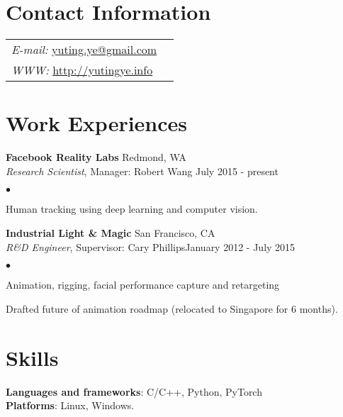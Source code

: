 \documentclass[margin,line]{res}
\newenvironment{list2}{
  \begin{list}{$\bullet$}{%
      \setlength{\itemsep}{0in}
      \setlength{\parsep}{0in} \setlength{\parskip}{0in}
      \setlength{\topsep}{0in} \setlength{\partopsep}{0in} 
      \setlength{\leftmargin}{0.2in}}}{\end{list}}
\begin{document}

\begin{resume}
\section{\sc Contact Information}
\vspace{.05in}
\begin{tabular}{@{}p{3in}p{3in}}
{\it E-mail:}    \href{mailto:yuting.ye@gmail.com}{yuting.ye@gmail.com} \\
{\it WWW:}  \href{http://yutingye.info}{http://yutingye.info} \\ 
\end{tabular}

\section{\sc Work Experiences}
{\bf Facebook Reality Labs} \hfill Redmond, WA \\
{\em Research Scientist}, Manager: Robert Wang \hfill July 2015 - present \\
\begin{list2}
\vspace*{-.15in}
\item Human tracking using deep learning and computer vision.
\end{list2}

{\bf Industrial Light \& Magic} \hfill San Francisco, CA  \\
{\em R\&D Engineer}, Supervisor: Cary Phillips\hfill January 2012 - July 2015 \\
\begin{list2}
\vspace*{-.15in}
\item Animation, rigging,  facial performance capture and retargeting
\item Drafted future of animation roadmap (relocated to Singapore for 6 months).
\end{list2}

\section{\sc Skills}
{\bf Languages and frameworks}: C/C++, Python, PyTorch\\
{\bf Platforms}: Linux, Windows. 


\end{resume}
\end{document}
